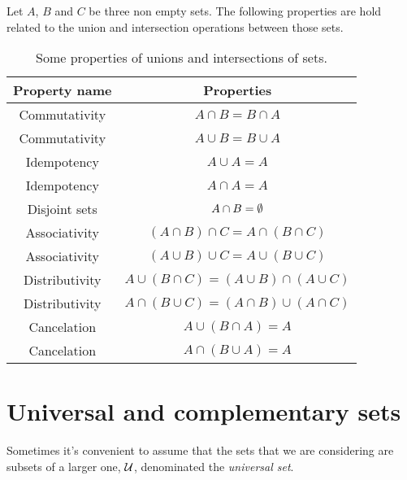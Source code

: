 Let $A$, $B$ and $C$ be three non empty sets. The following properties are hold related to the union and intersection operations between those sets.
\bgroup
\def\arraystretch{1.5}
\begin{table}[h!]
\centering
\begin{tabular}{|c|c|}
    \hline
    \textbf{Property name} & \textbf{Properties} \\
    \hline
    Commutativity & $A\cap B = B\cap A$ \\
    \hline
    Commutativity & $A\cup B = B\cup A$ \\
    \hline
    Idempotency & $A\cup A = A$ \\
    \hline
    Idempotency & $A\cap A = A$ \\
    \hline
    Disjoint sets & $A\cap B = \emptyset$ \\
    \hline
    Associativity & $\left( A\cap B \right)\cap C = A\cap\left( B\cap C \right)$ \\
    \hline
    Associativity & $\left( A\cup B \right)\cup C = A\cup\left( B\cup C \right)$ \\
    \hline
    Distributivity & $A\cup\left( B\cap C\right) = \left( A\cup B \right)\cap\left( A\cup C \right)$ \\
    \hline
    Distributivity & $A\cap\left( B\cup C\right) = \left( A\cap B \right)\cup\left( A\cap C \right)$ \\
    \hline
    Cancelation & $A\cup\left( B\cap A \right) = A$ \\
    \hline
    Cancelation & $A\cap\left( B\cup A \right) = A$ \\
    \hline
\end{tabular}
\caption{Some properties of unions and intersections of sets.}
\end{table}
\egroup

\section{Universal and complementary sets}
Sometimes it's convenient to assume that the sets that we are considering are subsets of a larger one, $\mathcal{U}$, denominated the \textit{universal set}.

